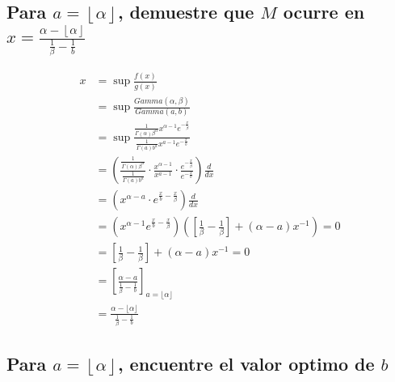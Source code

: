 \documentclass{article}
\begin{document}
\subsection{Para $a = \left\lfloor \alpha \right\rfloor$, demuestre que $M$ ocurre en $x = \frac{\alpha - \left\lfloor \alpha \right\rfloor}{\frac{1}{\beta} - \frac{1}{b}}$}
\[
	\begin{split}
		x & = \sup{\frac{f(x)}{g(x)}}                                                                                                                                                                \\
		  & = \sup{\frac{Gamma(\alpha, \beta)}{Gamma(a,b)}}                                                                                                                                          \\
		  & = \sup{\frac{\frac{1}{\Gamma(\alpha)\beta^\alpha}x^{\alpha-1} e^{-\frac{x}{\beta}}}{\frac{1}{\Gamma(a)b^a}x^{a-1}e^{-\frac{x}{b}}}}                                                      \\
		  & = \left(\frac{\frac{1}{\Gamma(\alpha)\beta^\alpha}}{\frac{1}{\Gamma(a)b^a}} \cdot \frac{x^{\alpha - 1}}{x^{a-1}} \cdot \frac{e^{-\frac{x}{\beta}}}{e^{-\frac{x}{b}}} \right)\frac{d}{dx} \\
		  & = \left( x^{\alpha -a} \cdot e^{\frac{x}{b} - \frac{x}{\beta}} \right) \frac{d}{dx}                                                                                                      \\
		  & = \left( x^{\alpha - 1}e^{\frac{x}{b} - \frac{x}{\beta}} \right) \left( \left[ \frac{1}{\beta} - \frac{1}{\beta} \right] + (\alpha - a)x^{-1} \right) = 0                                \\
		  & = \left[ \frac{1}{\beta} - \frac{1}{\beta} \right] + (\alpha - a)x^{-1} = 0                                                                                                              \\
		  & = \left[ \frac{\alpha - a}{\frac{1}{\beta} - \frac{1}{b}} \right]_{a = \lfloor \alpha \rfloor}                                                                                           \\
		  & = \frac{\alpha - \lfloor \alpha \rfloor}{\frac{1}{\beta} - \frac{1}{b}}
	\end{split}
\]

\subsection{Para $a = \left\lfloor \alpha \right\rfloor$, encuentre el valor optimo de $b$}
\end{document}
